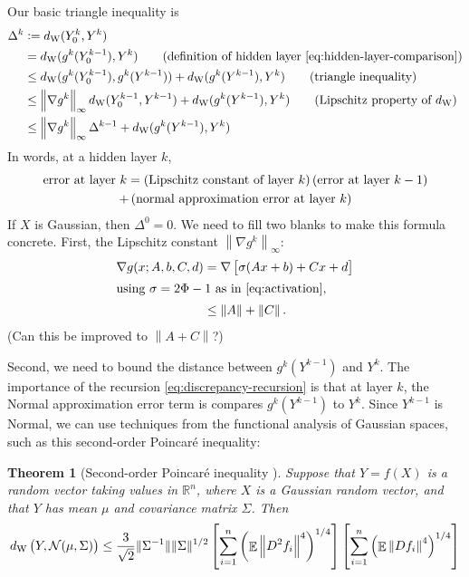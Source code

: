 \documentclass[oneside, article]{memoir}
\newtheorem{theorem}{Theorem}
\DeclareMathOperator{\expect}{\mathbb{E}}
\begin{document}
Our basic triangle inequality is
\begin{align}
  \Delta^k &:= d_\mathrm{W}(Y_0^k, Y^k) 
  \label{eq:discrepancy}
  \\
  &= d_\mathrm{W}(g^k(Y_0^{k-1}), Y^k)
  \tag{definition of hidden layer \eqref{eq:hidden-layer-comparison}}
  \\
  &\leq d_\mathrm{W}(g^k(Y_0^{k-1}), g^k(Y^{k-1})) + d_\mathrm{W}(g^k(Y^{k-1}), Y^k)
  \tag{triangle inequality}
  \\
  &\leq \left\|\nabla g^k\right\|_\infty d_\mathrm{W}(Y_0^{k-1}, Y^{k-1}) + d_\mathrm{W}(g^k(Y^{k-1}), Y^k)
  \tag{Lipschitz property of \(d_\mathrm{W}\)}
  \\
  &\leq \left\|\nabla g^k\right\|_\infty \Delta^{k-1} + d_\mathrm{W}(g^k(Y^{k-1}), Y^k)
  \label{eq:discrepancy-recursion}
\end{align}
In words, at a hidden layer \(k\),
\begin{multline}
  \text{error at layer \(k\)}
  = \del{\text{Lipschitz constant of layer \(k\)}} \del{\text{error at layer \(k-1\)}} 
  \\
  + \del{\text{normal approximation error at layer \(k\)}}  
\end{multline}
If \(X\) is Gaussian, then \(\Delta^0 = 0\).
We need to fill two blanks to make this formula concrete.
First, the Lipschitz constant \(\left\|\nabla g^k\right\|_\infty\):
\begin{align}
  \nabla g(x; A, b, C, d)
  &= \nabla \sbr{\sigma(A x + b) + C x +  d}
  \\
  \intertext{using \(\sigma = 2\Phi - 1\) as in \eqref{eq:activation},}
  &\leq \left\|A\right\| + \left\|C\right\|.
\end{align}
(Can this be improved to \(\left\|A + C\right\|\)?)

Second, we need to bound the distance between \(g^k(Y^{k-1})\) and \(Y^k\).
The importance of the recursion \eqref{eq:discrepancy-recursion} is that at layer \(k\), the Normal approximation error term is compares \(g^k(Y^{k-1})\) to \(Y^k\).
Since \(Y^{k-1}\) is Normal, we can use techniques from the functional analysis of Gaussian spaces, such as this second-order Poincar\'e inequality:
\begin{theorem}[Second-order Poincar\'e inequality {\cite[Theorem~7.1]{nourdin_second_2009}}]
Suppose that \(Y = f(X)\) is a random vector taking values in \(\mathbb{R}^n\), where \(X\) is a Gaussian random vector, and that \(Y\) has mean \(\mu\) and covariance matrix \(\Sigma\).
Then
\begin{align*}
  d_\mathrm{W}\del{Y, \mathcal N(\mu, \Sigma)}
  \leq \frac{3}{\sqrt 2} \|\Sigma^{-1}\| \|\Sigma\|^{1/2}
  \sbr{\sum_{i = 1}^n \del{\expect \left\|D^2 f_i\right\|^4}^{1/4}}
  \sbr{\sum_{i = 1}^n \del{\expect \left\|D f_i\right\|^4}^{1/4}}
\end{align*}
\end{theorem}
\end{document}
